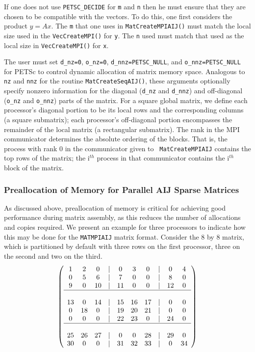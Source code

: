 If one does not use {\tt PETSC\_DECIDE} for
{\tt m} and {\tt n} then he must ensure that they are chosen to be
compatible with the vectors. To do this, one first considers the product 
$y = A x$. The {\tt m} that one uses in {\tt MatCreateMPIAIJ()}
must match the local size used in the {\tt VecCreateMPI()} for {\tt y}.
The {\tt n} used must match that used as the local size in 
{\tt VecCreateMPI()} for {\tt x}. 

The user must set {\tt d\_nz=0}, {\tt o\_nz=0}, {\tt d\_nnz=PETSC\_NULL}, and 
{\tt o\_nnz=PETSC\_NULL} for PETSc to control dynamic allocation of matrix
memory space.  Analogous to {\tt nz} and {\tt nnz} for the routine 
{\tt MatCreateSeqAIJ()}, these arguments optionally specify 
nonzero information for the diagonal ({\tt d\_nz} and {\tt d\_nnz}) and 
off-diagonal ({\tt o\_nz} and {\tt o\_nnz}) parts of the matrix. 
For a square global matrix, we define each processor's diagonal portion 
to be its local rows and the corresponding columns (a square submatrix);  
each processor's off-diagonal portion encompasses the remainder of the
local matrix (a rectangular submatrix).  
The rank in the MPI communicator determines the absolute ordering of the
blocks.  That is, the process with rank 0 in the communicator given to {\tt
  MatCreateMPIAIJ} contains the top rows of the matrix; the i$^{th}$ process
in that communicator contains the i$^{th}$ block of the matrix.

\subsubsection{Preallocation of Memory for Parallel AIJ Sparse Matrices}

As discussed above, preallocation of memory is critical for achieving good
performance during matrix assembly, as this reduces the number of
allocations and copies required.  We present an example for
three processors to indicate how this may be done for the {\tt MATMPIAIJ}
matrix format.  Consider the 8 by
8 matrix, which is partitioned by default with three rows on the first
processor, three on the second and two on the third.  {\small
\[
\left( \begin{array}{cccccccccc} 
1  & 2  & 0  & | & 0  & 3  & 0  & |  & 0  & 4  \\
0  & 5  & 6  & | & 7  & 0  & 0  & |  & 8  & 0 \\
9  & 0  & 10 & | & 11 & 0  & 0  & |  & 12 & 0  \\
\hline \\
13 & 0  & 14 & | & 15 & 16 & 17 & |  & 0  & 0  \\
0  & 18 & 0  & | & 19 & 20 & 21 & |  & 0  & 0 \\
0  & 0  & 0  & | & 22 & 23 & 0  & |  & 24 & 0 \\
\hline \\
25 & 26 & 27 & | & 0  & 0  & 28 & |  & 29 & 0 \\
30 & 0  & 0  & | & 31 & 32 & 33 & |  & 0  &34 
\end{array} \right)
\]
}

